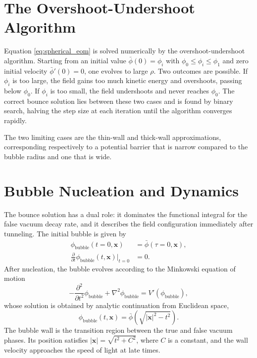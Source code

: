 
\section{The Overshoot-Undershoot Algorithm}

Equation \eqref{eq:spherical_eom} is solved numerically by the
overshoot-undershoot algorithm. Starting from an initial value
$\bar\phi(0) = \phi_i$ with $\phi_0\leq\phi_i\leq\phi_1$ and zero
initial velocity $\bar\phi'(0) = 0$, one evolves to large $\rho$. Two
outcomes are possible. If $\phi_i$ is too large, the field gains too
much kinetic energy and overshoots, passing below $\phi_0$. If $\phi_i$
is too small, the field undershoots and never reaches $\phi_0$. The
correct bounce solution lies between these two cases and is found by
binary search, halving the step size at each iteration until the
algorithm converges rapidly.

The two limiting cases are the thin-wall and thick-wall approximations,
corresponding respectively to a potential barrier that is narrow
compared to the bubble radius and one that is wide.


\section{Bubble Nucleation and Dynamics}

The bounce solution has a dual role: it dominates the functional
integral for the false vacuum decay rate, and it describes the field
configuration immediately after tunneling. The initial bubble is given
by
\begin{align}
    \phi_{\text{bubble}}(t=0,\mathbf{x})
    &= \bar\phi(\tau=0,\mathbf{x}), \\
    \frac{\partial}{\partial t}\phi_{\text{bubble}}(t,\mathbf{x})
    \big|_{t=0} &= 0.
\end{align}
After nucleation, the bubble evolves according to the Minkowski
equation of motion
\begin{equation}
    -\frac{\partial^2}{\partial t^2}\phi_{\text{bubble}}
    + \nabla^2\phi_{\text{bubble}} = V'(\phi_{\text{bubble}}),
    \label{eq:bubble_eom}
\end{equation}
whose solution is obtained by analytic continuation from Euclidean
space,
\begin{equation}
    \phi_{\text{bubble}}(t,\mathbf{x})
    = \bar\phi\!\left(\sqrt{|\mathbf{x}|^2 - t^2}\right).
\end{equation}
The bubble wall is the transition region between the true and false
vacuum phases. Its position satisfies
$|\mathbf{x}| = \sqrt{t^2 + C^2}$, where $C$ is a constant, and the
wall velocity approaches the speed of light at late times.

